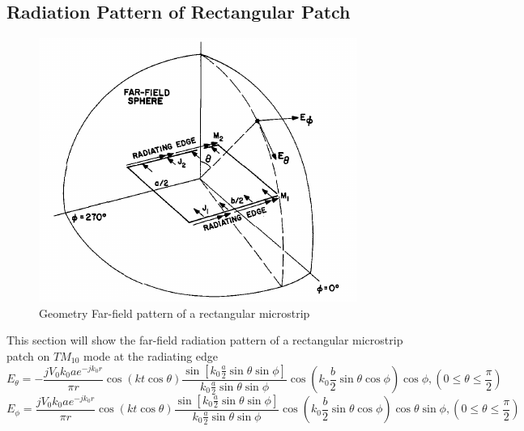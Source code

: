 \documentclass[11pt,a4paper]{article}
\begin{document}
  \newpage
      \subsection{Radiation Pattern of Rectangular Patch}
        \begin{figure}[ht]
          \includegraphics{microstrip_rad.png}
          \centering
          \caption{Geometry Far-field pattern of a rectangular microstrip \cite{CaM:81}}
        \end{figure}
        \indent This section will show the far-field radiation pattern of a rectangular microstrip patch on $TM_{10}$ mode at the radiating edge\cite{CaM:81}
        \begin{equation}
          E_{\theta} = - \frac{jV_0k_0ae^{-jk_0r}}{\pi r} \cos(kt\cos\theta) \frac{\sin[k_0 \frac{a}{2} \sin\theta\sin\phi]}{k_0 \frac{a}{2} \sin\theta\sin\phi}\cos(k_0\frac{b}{2}\sin{\theta}\cos{\phi})\cos{\phi}, (0 \leq \theta \leq \frac{\pi}{2})
        \end{equation}
        \begin{equation}
          E_{\phi} = \frac{jV_0k_0ae^{-jk_0r}}{\pi r} \cos(kt\cos\theta) \frac{\sin[k_0 \frac{a}{2} \sin\theta\sin\phi]}{k_0 \frac{a}{2} \sin\theta\sin\phi}\cos(k_0\frac{b}{2}\sin{\theta}\cos{\phi})\cos{\theta}\sin{\phi}, (0 \leq \theta \leq \frac{\pi}{2})
        \end{equation}
      
  \newpage
\end{document}
